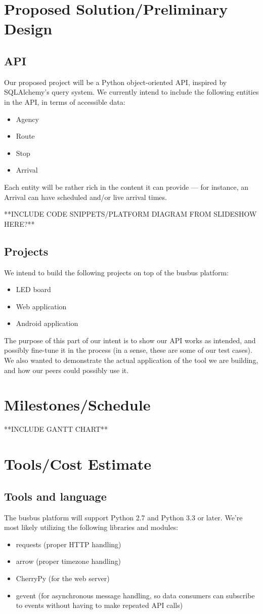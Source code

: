 \documentclass[12pt]{article}
\begin{document}
\section{Proposed Solution/Preliminary Design}
\subsection{API}
Our proposed project will be a Python object-oriented API, inspired by SQLAlchemy's query system.
We currently intend to include the following entities in the API, in terms of accessible data:
\begin{itemize}
\item Agency
\item Route
\item Stop
\item Arrival
\end{itemize}
Each entity will be rather rich in the content it can provide --- for instance, an Arrival can have scheduled
and/or live arrival times.

**INCLUDE CODE SNIPPETS/PLATFORM DIAGRAM FROM SLIDESHOW HERE?**

\subsection{Projects}
We intend to build the following projects on top of the busbus platform:
\begin{itemize}
\item LED board
\item Web application
\item Android application
\end{itemize}
The purpose of this part of our intent is to show our API works as intended, and possibly
fine-tune it in the process (in a sense, these are some of our test cases). We also wanted 
to demonstrate the actual application of the tool we are building, and how our peers
could possibly use it.

\section{Milestones/Schedule}
**INCLUDE GANTT CHART**

\section{Tools/Cost Estimate}
\subsection{Tools and language}
The busbus platform will support Python 2.7 and Python 3.3 or later. We're most likely utilizing the following
libraries and modules:
\begin{itemize}
\item requests (proper HTTP handling)
\item arrow (proper timezone handling)
\item CherryPy (for the web server)
\item gevent (for asynchronous message handling, so data consumers can subscribe to events
without having to make repeated API calls)
\end{itemize}
\end{document}
